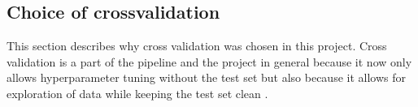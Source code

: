 \subsection{Choice of crossvalidation}

This section describes why cross validation was chosen in this project. Cross validation is a part of the pipeline and the project in general because it now only allows hyperparameter tuning without the test set but also because it allows for exploration of data while keeping the test set clean \cite{james-statistical-learning}.